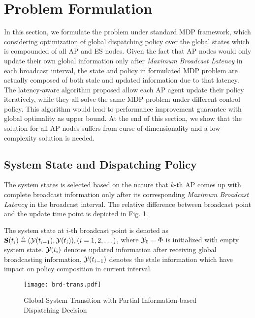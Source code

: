 \section{Problem Formulation}
In this section, we formulate the problem under standard MDP framework, which considering optimization of global dispatching policy over the global states which is compounded of all AP and ES nodes.
Given the fact that AP nodes would only update their own global information only after \emph{Maximum Broadcast Latency} in each broadcast interval, the state and policy in formulated MDP problem are actually composed of both stale and updated information due to that latency.
The latency-aware algorithm proposed allow each AP agent update their policy iteratively, while they all solve the same MDP problem under different control policy. This algorithm would lead to performance improvement guarantee with global optimality as upper bound.
At the end of this section, we show that the solution for all AP nodes suffers from curse of dimensionality and a low-complexity solution is needed.

\subsection{System State and Dispatching Policy}
The system states is selected based on the nature that $k$-th AP comes up with complete broadcast information only after its corresponding \emph{Maximum Broadcast Latency} in the broadcast interval.
The relative difference between broadcast point and the update time point is depicted in Fig. \ref{fig:brd-trans}.
\begin{definition}
    The system state at $i$-th broadcast point is denoted as
    $\mathbf{S}(t_i) \triangleq (\mathcal{Y}(t_{i-1}), \mathcal{Y}(t_{i})), (i=1,2,\dots)$,
    where $\mathcal{Y}_{0} =\Phi$ is initialized with empty system state.
    $\mathcal{Y}(t_{i})$ denotes updated information after receiving global broadcasting information, $\mathcal{Y}(t_{i-1})$ denotes the stale information which have impact on policy composition in current interval.
\end{definition}

\begin{figure}[ht]
    \centering
    \texttt{[image: brd-trans.pdf]}
    \caption{Global System Transition with Partial Information-based Dispatching Decision}
    \label{fig:brd-trans}
\end{figure}

